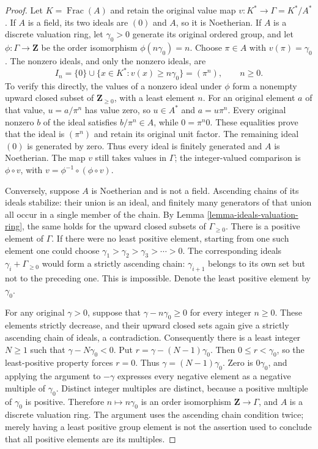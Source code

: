 \begin{proof}
Let $K=\operatorname{Frac}(A)$ and retain the original value map
$v:K^*\to\Gamma=K^*/A^*$. If $A$ is a field, its two ideals
are $(0)$ and $A$, so it is Noetherian.
If $A$ is a discrete valuation ring, let $\gamma_0>0$ generate
its original ordered group, and let
$\phi:\Gamma\to\mathbf Z$ be the order isomorphism
$\phi(n\gamma_0)=n$. Choose $\pi\in A$ with
$v(\pi)=\gamma_0$. The nonzero ideals, and only the nonzero
ideals, are
$$
I_n=\{0\}\cup\{x\in K^*:v(x)\geq n\gamma_0\}
=(\pi^n),\qquad n\geq0.
$$
To verify this directly, the values of a nonzero ideal under
$\phi$ form a nonempty upward closed subset of
$\mathbf Z_{\geq0}$, with a least element $n$.
For an original element $a$ of that value,
$u=a/\pi^n$ has value zero, so $u\in A^*$ and
$a=u\pi^n$. Every original nonzero $b$ of the ideal satisfies
$b/\pi^n\in A$, while $0=\pi^n0$. These equalities prove
that the ideal is $(\pi^n)$ and retain its original unit factor.
The remaining ideal $(0)$ is generated by zero. Thus every ideal
is finitely generated and $A$ is Noetherian. The map $v$ still
takes values in $\Gamma$; the integer-valued comparison is
$\phi\circ v$, with $v=\phi^{-1}\circ(\phi\circ v)$.

Conversely, suppose $A$ is Noetherian and is not a field.
Ascending chains of its ideals stabilize: their union is an ideal,
and finitely many generators of that union all occur in a single
member of the chain. By Lemma \ref{lemma-ideals-valuation-ring},
the same holds for the upward closed subsets of
$\Gamma_{\geq0}$. There is a positive element of $\Gamma$.
If there were no least positive element, starting from one such
element one could choose
$\gamma_1>\gamma_2>\gamma_3>\cdots>0$.
The corresponding ideals
$\gamma_i+\Gamma_{\geq0}$ would form a strictly ascending
chain: $\gamma_{i+1}$ belongs to its own set but not to the
preceding one. This is impossible. Denote the least positive
element by $\gamma_0$.

For any original $\gamma>0$, suppose that
$\gamma-n\gamma_0\geq0$ for every integer $n\geq0$.
These elements strictly decrease, and their upward closed sets
again give a strictly ascending chain of ideals, a contradiction.
Consequently there is a least integer $N\geq1$ such that
$\gamma-N\gamma_0<0$. Put
$r=\gamma-(N-1)\gamma_0$. Then
$0\leq r<\gamma_0$, so the least-positive property forces
$r=0$. Thus $\gamma=(N-1)\gamma_0$.
Zero is $0\gamma_0$, and applying the argument to $-\gamma$
expresses every negative element as a negative multiple of
$\gamma_0$. Distinct integer multiples are distinct, because
a positive multiple of $\gamma_0$ is positive. Therefore
$n\mapsto n\gamma_0$ is an order isomorphism
$\mathbf Z\to\Gamma$, and $A$ is a discrete valuation ring.
The argument uses the ascending chain condition twice; merely
having a least positive group element is not the assertion used
to conclude that all positive elements are its multiples.
\end{proof}























